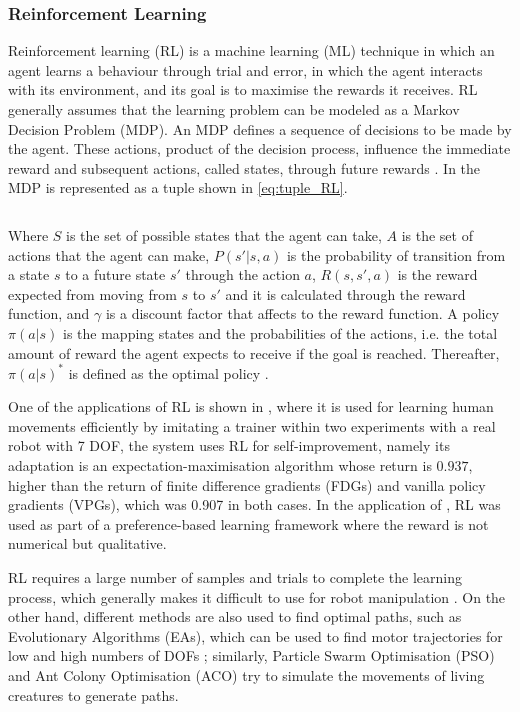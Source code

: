 \documentclass[thesis]{mas_proposal}
\begin{document}
	\subsubsection{Reinforcement Learning}
		
		Reinforcement learning (RL) is a machine learning (ML) technique in which an agent learns a behaviour through trial and error, in which the agent interacts with its environment, and its goal is to maximise the rewards it receives. RL generally assumes that the learning problem can be modeled as a Markov Decision Problem (MDP). An MDP defines a sequence of decisions to be made by the agent. These actions, product of the decision process, influence the immediate reward and subsequent actions, called states, through future rewards \cite{Kaelbling1996, Brunke2022, Elguea2023}. In \cite{Elguea2023} the MDP is represented as a tuple shown in \ref{eq:tuple_RL}. 
		
		\begin{equation}
			[S, A, P(s'|s, a), R(s, s', a), \gamma]
		\label{eq:tuple_RL}
		\end{equation}
		
		Where $S$ is the set of possible states that the agent can take, $A$ is the set of actions that the agent can make, $P(s'|s, a)$ is the probability of transition from a state $s$ to a future state $s'$ through the action $a$, $R(s, s', a)$ is the reward expected from moving from $s$ to $s'$ and it is calculated through the reward function, and $\gamma$ is a discount factor that affects to the reward function. A policy $\pi(a|s)$ is the mapping states and the probabilities of the actions, i.e. the total amount of reward the agent expects to receive if the goal is reached. Thereafter, $\pi(a|s)^*$ is defined as the optimal policy \cite{Hussein2018, Elguea2023}. 
			
		One of the applications of RL is shown in \cite{Kober2010}, where it is used for learning human movements efficiently by imitating a trainer within two experiments with a real robot with 7 DOF, the system uses RL for self-improvement, namely its adaptation is an expectation-maximisation algorithm whose return is $0.937$, higher than the return of finite difference gradients (FDGs) and vanilla policy gradients (VPGs), which was 0.907 in both cases. In the application of \cite{Fuernkranz2012}, RL was used as part of a preference-based learning framework where the reward is not numerical but qualitative. 
		
		RL requires a large number of samples and trials to complete the learning process, which generally makes it difficult to use for robot manipulation \cite{Hua2021}. On the other hand, different methods are also used to find optimal paths, such as Evolutionary Algorithms (EAs), which can be used to find motor trajectories for low and high numbers of DOFs \cite{Nolfi2000}; similarly, Particle Swarm Optimisation (PSO) \cite{Zhang2015} and Ant Colony Optimisation (ACO) \cite{Zhang2010} try to simulate the movements of living creatures to generate paths.
	
\end{document}
